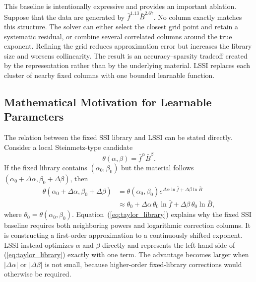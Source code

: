 \documentclass[lettersize,journal]{IEEEtran}
\newcommand{\fbar}{\bar{f}}
\newcommand{\Bbar}{\bar{B}}
\begin{document}
This baseline is intentionally expressive and provides an important ablation. Suppose that the data are generated by $\fbar^{1.13}\Bbar^{2.67}$. No column exactly matches this structure. The solver can either select the closest grid point and retain a systematic residual, or combine several correlated columns around the true exponent. Refining the grid reduces approximation error but increases the library size and worsens collinearity. The result is an accuracy--sparsity tradeoff created by the representation rather than by the underlying material. LSSI replaces each cluster of nearby fixed columns with one bounded learnable function.

\subsection{Mathematical Motivation for Learnable Parameters}

The relation between the fixed SSI library and LSSI can be stated directly. Consider a local Steinmetz-type candidate
\begin{equation}
 \theta(\alpha,\beta)=\fbar^{\alpha}\Bbar^{\beta}.
 \label{eq:base_power}
\end{equation}
If the fixed library contains $(\alpha_0,\beta_0)$ but the material follows $(\alpha_0+\Delta\alpha,\beta_0+\Delta\beta)$, then
\begin{align}
 \theta(\alpha_0+\Delta\alpha,\beta_0+\Delta\beta)
 &=\theta(\alpha_0,\beta_0)
 e^{\Delta\alpha\ln\fbar+\Delta\beta\ln\Bbar} \nonumber\\
 &\approx \theta_0+\Delta\alpha\,\theta_0\ln\fbar
 +\Delta\beta\,\theta_0\ln\Bbar,
 \label{eq:taylor_library}
\end{align}
where $\theta_0=\theta(\alpha_0,\beta_0)$. Equation~(\ref{eq:taylor_library}) explains why the fixed SSI baseline requires both neighboring powers and logarithmic correction columns. It is constructing a first-order approximation to a continuously shifted exponent. LSSI instead optimizes $\alpha$ and $\beta$ directly and represents the left-hand side of (\ref{eq:taylor_library}) exactly with one term. The advantage becomes larger when $|\Delta\alpha|$ or $|\Delta\beta|$ is not small, because higher-order fixed-library corrections would otherwise be required.
\end{document}
